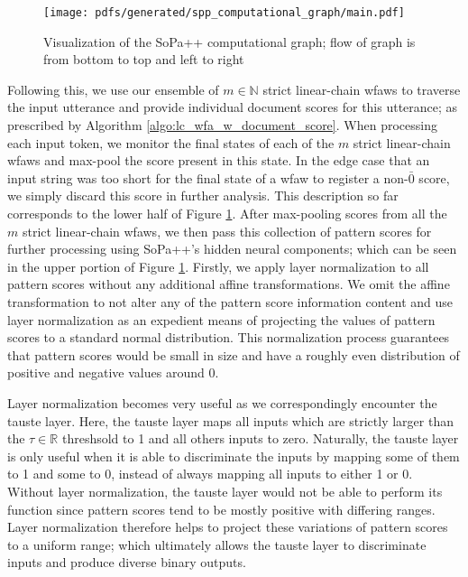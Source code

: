 \begin{figure}[t!]
  \centering
  \texttt{[image: pdfs/generated/spp\_computational\_graph/main.pdf]}
  \caption{Visualization of the SoPa++ computational graph; flow of graph is
    from bottom to top and left to right }
  \label{fig:spp_cg}
\end{figure}

Following this, we use our ensemble of $m \in \mathbb{N}$ strict linear-chain
\ac{wfaws} to traverse the input utterance and provide individual document
scores for this utterance; as prescribed by Algorithm
\ref{algo:lc_wfa_w_document_score}. When processing each input token, we monitor
the final states of each of the $m$ strict linear-chain \ac{wfaws} and
max-pool the score present in this state. In the edge case that an input string
was too short for the final state of a \ac{wfaw} to register a non-$\bar{0}$
score, we simply discard this score in further analysis. This description so far
corresponds to the lower half of Figure \ref{fig:spp_cg}. After max-pooling
scores from all the $m$ strict linear-chain \ac{wfaws}, we then pass this
collection of pattern scores for further processing using SoPa++'s hidden neural
components; which can be seen in the upper portion of Figure \ref{fig:spp_cg}.
Firstly, we apply layer normalization \citep{ba2016layer} to all pattern scores
without any additional affine transformations. We omit the affine transformation
to not alter any of the pattern score information content and use layer
normalization as an expedient means of projecting the values of pattern scores
to a standard normal distribution. This normalization process guarantees that
pattern scores would be small in size and have a roughly even distribution of
positive and negative values around 0.

Layer normalization becomes very useful as we correspondingly encounter the
\ac{tauste} layer. Here, the \ac{tauste} layer maps all inputs which are strictly larger
than the $\tau \in \mathbb{R}$ threshsold to 1 and all others inputs to zero.
Naturally, the \ac{tauste} layer is only useful when it is able to discriminate the
inputs by mapping some of them to 1 and some to 0, instead of always mapping all
inputs to either 1 or 0. Without layer normalization, the \ac{tauste} layer would not
be able to perform its function since pattern scores tend to be mostly positive
with differing ranges. Layer normalization therefore helps to project these
variations of pattern scores to a uniform range; which ultimately allows the \ac{tauste}
layer to discriminate inputs and produce diverse binary outputs.


